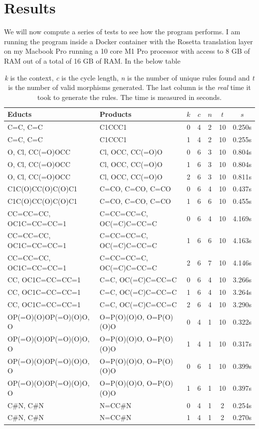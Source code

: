 \documentclass{article}
\begin{document}
\section{Results}
We will now compute a series of tests to see how the program performs. I am running the program inside a Docker container with the Rosetta translation layer on my Macbook Pro running a 10 core M1 Pro processor with access to 8 GB of RAM out of a total of 16 GB of RAM. In the below table  
\begin{table}[h]
    \centering
    \begin{tabular}{ll|ccccc}\\
        Educts & Products & $k$ & $c$ & $n$ & $t$ & $s$\\\hline
        C=C, C=C & C1CCC1 & 0 & 4 & 2 & 10 & 0.250s \\
        C=C, C=C & C1CCC1 & 1 & 4 & 2 & 10 & 0.255s \\
        O, Cl, CC(=O)OCC & Cl, OCC, CC(=O)O & 0 & 6 & 3 & 10 & 0.804s \\
        O, Cl, CC(=O)OCC & Cl, OCC, CC(=O)O & 1 & 6 & 3 & 10 & 0.804s \\
        O, Cl, CC(=O)OCC & Cl, OCC, CC(=O)O & 2 & 6 & 3 & 10 & 0.811s \\
        C1C(O)CC(O)C(O)C1 & C=CO, C=CO, C=CO  & 0 & 6 & 4 & 10 & 0.437s \\
        C1C(O)CC(O)C(O)C1 & C=CO, C=CO, C=CO  & 1 & 6 & 6 & 10 & 0.455s \\
        CC=CC=CC, OC1C=CC=CC=1 & C=CC=CC=C, OC(=C)C=CC=C & 0 & 6 & 4 & 10 & 4.169s \\
        CC=CC=CC, OC1C=CC=CC=1 & C=CC=CC=C, OC(=C)C=CC=C & 1 & 6 & 6 & 10 & 4.163s \\
        CC=CC=CC, OC1C=CC=CC=1 & C=CC=CC=C, OC(=C)C=CC=C & 2 & 6 & 7 & 10 & 4.146s \\
        CC, OC1C=CC=CC=1 & C=C, OC(=C)C=CC=C & 0 & 6 & 4 & 10 & 3.266s \\
        CC, OC1C=CC=CC=1 & C=C, OC(=C)C=CC=C & 1 & 6 & 4 & 10 & 3.264s \\
        CC, OC1C=CC=CC=1 & C=C, OC(=C)C=CC=C & 2 & 6 & 4 & 10 & 3.290s \\
        OP(=O)(O)OP(=O)(O)O, O & O=P(O)(O)O, O=P(O)(O)O  & 0 & 4 & 1 & 10 & 0.322s \\
        OP(=O)(O)OP(=O)(O)O, O & O=P(O)(O)O, O=P(O)(O)O  & 1 & 4 & 1 & 10 & 0.317s \\
        OP(=O)(O)OP(=O)(O)O, O & O=P(O)(O)O, O=P(O)(O)O  & 0 & 6 & 1 & 10 & 0.399s \\
        OP(=O)(O)OP(=O)(O)O, O & O=P(O)(O)O, O=P(O)(O)O  & 1 & 6 & 1 & 10 & 0.397s \\
        C\#N, C\#N & N=CC\#N & 0 & 4 & 1 & 2 & 0.254s \\
        C\#N, C\#N & N=CC\#N & 1 & 4 & 1 & 2 & 0.270s \\
    \end{tabular}
    \caption{
        \textit{k} is the context, \textit{c} is the cycle length, \textit{n} is the number of unique rules found and \textit{t} is  the number of valid morphisms generated. The last column is the \textit{real} time it took to generate the rules. The time is measured in seconds.
    }
    
\end{table}
\newpage
\end{document}
